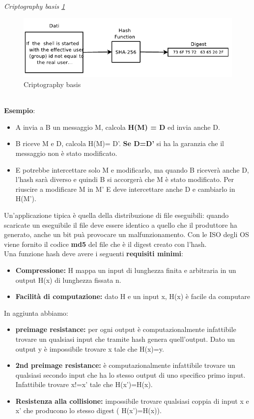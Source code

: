\documentclass[12pt]{article}
\begin{document}
			\textit{Criptography basis \ref{fig:12}}\\
			\begin{figure}[h!]
				\centering
				\includegraphics[scale=0.60]{img/sha.PNG}
				\caption{Criptography basis \label{fig:12}}
			\end{figure}\\
			
			\textbf{Esempio}:
			\begin{itemize}
				\item A invia a B un messaggio M, calcola \textbf{H(M) = D} ed invia anche D.
				\item B riceve M e D, calcola H(M)= D'.\textbf{ Se D=D'} si ha la garanzia che il messaggio non è stato modificato.
				\item E potrebbe intercettare solo M e modificarlo, ma quando B riceverà anche D, l'hash sarà diverso e quindi B si accorgerà che M è stato modificato. Per riuscire a modificare M in M' E deve intercettare anche D e cambiarlo in H(M').
			\end{itemize}
			Un'applicazione tipica è quella della distribuzione di file eseguibili: quando scaricate un eseguibile il file deve essere identico a quello che il produttore ha generato, anche un bit puà provocare un malfunzionamento. Con le ISO degli OS viene fornito il codice \textbf{md5} del file che è il digest creato con l'hash. \\
			Una funzione hash deve avere i seguenti \textbf{requisiti minimi}:
			\begin{itemize}
				\item \textbf{Compressione:} H mappa un input di lunghezza finita e arbitraria in un output H(x) di lunghezza fissata n.
				\item \textbf{Facilità di computazione:} dato H e un input x, H(x) è facile da computare 
			\end{itemize}
			In aggiunta abbiamo:
			\begin{itemize}
				\item \textbf{preimage resistance:} per ogni output è computazionalmente infattibile trovare un qualsiasi input che tramite hash genera quell'output. Dato un output y è impossibile trovare x tale che H(x)=y.
				\item \textbf{2nd preimage resistance:} è computazionalmente infattibile trovare un qualsiasi secondo input che ha lo stesso output di uno specifico primo input. Infattibile trovare x!=x' tale che H(x')=H(x).
				\item \textbf{Resistenza alla collisione:} impossibile trovare qualsiasi coppia di input x e x' che producono lo stesso digest ( H(x')=H(x)).
			\end{itemize}
\end{document}
